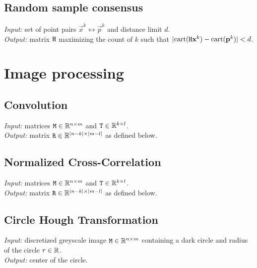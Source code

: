 \subsection{Random sample consensus}

\textit{Input:} set of point pairs $\vec x^k \leftrightarrow \vec p^k$ and distance limit $d$.\\
\textit{Output:} matrix $\mathtt{H}$ maximizing the count of $k$ such that $|\mathrm{cart}(\mathtt{H} \mathbf{x}^k) - \mathrm{cart}(\mathbf{p}^k)| < d$.\\

\section{Image processing}


\subsection{Convolution}

\textit{Input:} matrices $\mathtt{M} \in \mathbb{R}^{n \times m}$ and $\mathtt{T} \in \mathbb{R}^{k \times l}$.\\
\textit{Output:} matrix $\mathtt{R} \in \mathbb{R}^{|n-k| \times |m - l|}$ as defined below.\\

\subsection{Normalized Cross-Correlation}

\textit{Input:} matrices $\mathtt{M} \in \mathbb{R}^{n \times m}$ and $\mathtt{T} \in \mathbb{R}^{k \times l}$.\\
\textit{Output:} matrix $\mathtt{R} \in \mathbb{R}^{|n-k| \times |m - l|}$ as defined below.\\


\subsection{Circle Hough Transformation}

\textit{Input:} discretized greyscale image $\mathtt{M} \in \mathbb{R}^{n \times m}$ containing a dark circle and radius of the circle $r \in \mathbb{R}$.\\
\textit{Output:} center of the circle.\\

